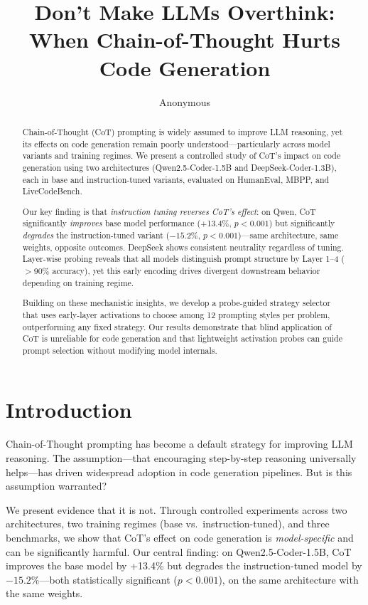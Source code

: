 \documentclass{article}
\title{Don't Make LLMs Overthink: When Chain-of-Thought Hurts Code Generation}
\author{Anonymous}
\begin{document}
\maketitle

\begin{abstract}
Chain-of-Thought (CoT) prompting is widely assumed to improve LLM reasoning, yet its effects on code generation remain poorly understood---particularly across model variants and training regimes. We present a controlled study of CoT's impact on code generation using two architectures (Qwen2.5-Coder-1.5B and DeepSeek-Coder-1.3B), each in base and instruction-tuned variants, evaluated on HumanEval, MBPP, and LiveCodeBench.

Our key finding is that \emph{instruction tuning reverses CoT's effect}: on Qwen, CoT significantly \emph{improves} base model performance (+13.4\%, $p{<}0.001$) but significantly \emph{degrades} the instruction-tuned variant ($-15.2\%$, $p{<}0.001$)---same architecture, same weights, opposite outcomes. DeepSeek shows consistent neutrality regardless of tuning. Layer-wise probing reveals that all models distinguish prompt structure by Layer 1--4 ($>$90\% accuracy), yet this early encoding drives divergent downstream behavior depending on training regime.

Building on these mechanistic insights, we develop a probe-guided strategy selector that uses early-layer activations to choose among 12 prompting styles per problem, outperforming any fixed strategy. Our results demonstrate that blind application of CoT is unreliable for code generation and that lightweight activation probes can guide prompt selection without modifying model internals.
\end{abstract}

\section{Introduction}

Chain-of-Thought prompting \citep{wei2022chain} has become a default strategy for improving LLM reasoning. The assumption---that encouraging step-by-step reasoning universally helps---has driven widespread adoption in code generation pipelines. But is this assumption warranted?

We present evidence that it is not. Through controlled experiments across two architectures, two training regimes (base vs.\ instruction-tuned), and three benchmarks, we show that CoT's effect on code generation is \emph{model-specific} and can be significantly harmful. Our central finding: on Qwen2.5-Coder-1.5B, CoT improves the base model by +13.4\% but degrades the instruction-tuned model by $-15.2\%$---both statistically significant ($p{<}0.001$), on the same architecture with the same weights.
\end{document}
